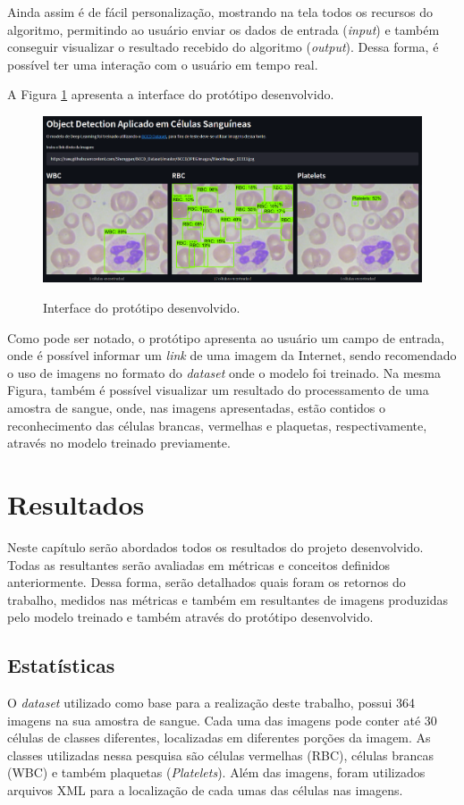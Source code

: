 Ainda assim é de fácil personalização, mostrando na tela todos os recursos do algoritmo, permitindo ao usuário enviar os dados de entrada (\emph{input}) e também conseguir visualizar o resultado recebido do algoritmo (\emph{output}). Dessa forma, é possível ter uma interação com o usuário em tempo real.

A Figura \ref{fig:prototipo} apresenta a interface do protótipo desenvolvido.

\begin{figure}[!htb]
	\centering
	\caption{Interface do protótipo desenvolvido.}
	\includegraphics[width=1.0\textwidth]{img/prototipo.png}
	\label{fig:prototipo}
\end{figure}

Como pode ser notado, o protótipo apresenta ao usuário um campo de entrada, onde é possível informar um \emph{link} de uma imagem da Internet, sendo recomendado o uso de imagens no formato do \emph{dataset} onde o modelo foi treinado. Na mesma Figura, também é possível visualizar um resultado do processamento de uma amostra de sangue, onde, nas imagens apresentadas, estão contidos o reconhecimento das células brancas, vermelhas e plaquetas, respectivamente, através no modelo treinado previamente.

\chapter{Resultados}
\label{chap:resultados}
Neste capítulo serão abordados todos os resultados do projeto desenvolvido. Todas as resultantes serão avaliadas em métricas e conceitos definidos anteriormente. Dessa forma, serão detalhados quais foram os retornos do trabalho, medidos nas métricas e também em resultantes de imagens produzidas pelo modelo treinado e também através do protótipo desenvolvido.

\section{Estatísticas}
O \emph{dataset} utilizado como base para a realização deste trabalho, possui 364 imagens na sua amostra de sangue. Cada uma das imagens pode conter até 30 células de classes diferentes, localizadas em diferentes porções da imagem. As classes utilizadas nessa pesquisa são células vermelhas (RBC), células brancas (WBC) e também plaquetas (\emph{Platelets}). Além das imagens, foram utilizados arquivos XML para a localização de cada umas das células nas imagens.

